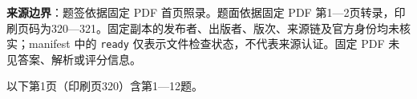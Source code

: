 

\begin{gktip}
\textbf{来源边界}：题签依据固定 PDF 首页照录。题面依据固定 PDF 第1—2页转录，印刷页码为320—321。固定副本的发布者、出版者、版次、来源链及官方身份均未核实；manifest 中的 \texttt{ready} 仅表示文件检查状态，不代表来源认证。固定 PDF 未见答案、解析或评分信息。
\end{gktip}


\begin{gktip}
以下第1页（印刷页320）含第1—12题。
\end{gktip}

